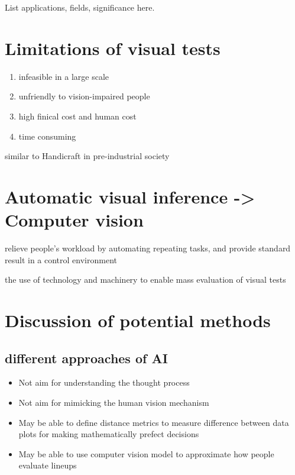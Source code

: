 \documentclass{monashthesis}
\begin{document}
List applications, fields, significance here.

\hypertarget{limitations-of-visual-tests}{%
\section{Limitations of visual tests}\label{limitations-of-visual-tests}}

\begin{enumerate}
\def\labelenumi{\arabic{enumi}.}
\tightlist
\item
  infeasible in a large scale
\item
  unfriendly to vision-impaired people
\item
  high finical cost and human cost
\item
  time consuming
\end{enumerate}

similar to Handicraft in pre-industrial society

\hypertarget{automatic-visual-inference---computer-vision}{%
\section{Automatic visual inference -\textgreater{} Computer vision}\label{automatic-visual-inference---computer-vision}}

relieve people's workload by automating repeating tasks, and provide standard result in a control environment

the use of technology and machinery to enable mass evaluation of visual tests

\hypertarget{discussion-of-potential-methods}{%
\section{Discussion of potential methods}\label{discussion-of-potential-methods}}

\hypertarget{different-approaches-of-ai}{%
\subsection{different approaches of AI}\label{different-approaches-of-ai}}

\begin{itemize}
\tightlist
\item
  Not aim for understanding the thought process
\item
  Not aim for mimicking the human vision mechanism
\item
  May be able to define distance metrics to measure difference between data plots for making mathematically prefect decisions
\item
  May be able to use computer vision model to approximate how people evaluate lineups
\end{itemize}
\end{document}

